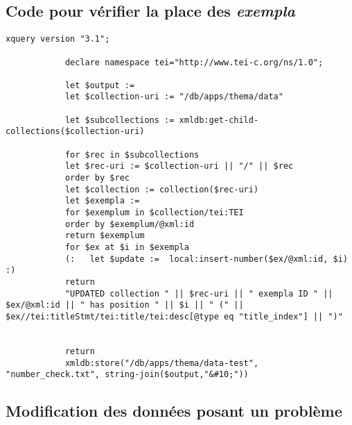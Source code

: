 \subsection{Code pour vérifier la place des \textit{exempla}}

		\begin{lstlisting}[breaklines=true]
			xquery version "3.1";
			
			declare namespace tei="http://www.tei-c.org/ns/1.0";
			
			let $output :=
			let $collection-uri := "/db/apps/thema/data"
			
			let $subcollections := xmldb:get-child-collections($collection-uri)
			
			for $rec in $subcollections
			let $rec-uri := $collection-uri || "/" || $rec
			order by $rec
			let $collection := collection($rec-uri)
			let $exempla :=
			for $exemplum in $collection/tei:TEI
			order by $exemplum/@xml:id
			return $exemplum
			for $ex at $i in $exempla
			(:   let $update :=  local:insert-number($ex/@xml:id, $i) :)
			return
			"UPDATED collection " || $rec-uri || " exempla ID " || $ex/@xml:id || " has position " || $i || " (" || $ex//tei:titleStmt/tei:title/tei:desc[@type eq "title_index"] || ")"
			
			
			return
			xmldb:store("/db/apps/thema/data-test", "number_check.txt", string-join($output,"&#10;"))
		\end{lstlisting}

\subsection{Modification des données posant un problème}
		
